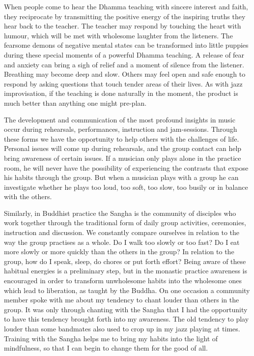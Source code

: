 When people come to hear the Dhamma teaching with sincere interest and
faith, they reciprocate by transmitting the positive energy of the
inspiring truths they hear back to the teacher. The teacher may respond
by touching the heart with humour, which will be met with wholesome
laughter from the listeners. The fearsome demons of negative mental
states can be transformed into little puppies during these special
moments of a powerful Dhamma teaching. A release of fear and anxiety can
bring a sigh of relief and a moment of silence from the listener.
Breathing may become deep and slow. Others may feel open and safe enough
to respond by asking questions that touch tender areas of their lives.
As with jazz improvisation, if the teaching is done naturally in the
moment, the product is much better than anything one might pre-plan.

The development and communication of the most profound insights in music
occur during rehearsals, performances, instruction and jam-sessions.
Through these forms we have the opportunity to help others with the
challenges of life. Personal issues will come up during rehearsals, and
the group contact can help bring awareness of certain issues. If a
musician only plays alone in the practice room, he will never have the
possibility of experiencing the contrasts that expose his habits through
the group. But when a musician plays with a group he can investigate
whether he plays too loud, too soft, too slow, too busily or in balance
with the others.

Similarly, in Buddhist practice the Sangha is the community of disciples
who work together through the traditional form of daily group
activities, ceremonies, instruction and discussion. We constantly
compare ourselves in relation to the way the group practises as a whole.
Do I walk too slowly or too fast? Do I eat more slowly or more quickly
than the others in the group? In relation to the group, how do I speak,
sleep, do chores or put forth effort? Being aware of these habitual
energies is a preliminary step, but in the monastic practice awareness
is encouraged in order to transform unwholesome habits into the
wholesome ones which lead to liberation, as taught by the Buddha. On one
occasion a community member spoke with me about my tendency to chant
louder than others in the group. It was only through chanting with the
Sangha that I had the opportunity to have this tendency brought forth
into my awareness. The old tendency to play louder than some bandmates
also used to crop up in my jazz playing at times. Training with the
Sangha helps me to bring my habits into the light of mindfulness, so
that I can begin to change them for the good of all.

